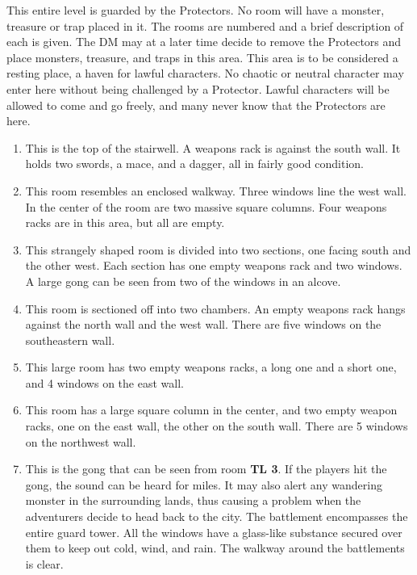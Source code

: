 \documentclass[palace_of_the_silver_princess]{subfiles}
\begin{document}
\selectfont
\clearpage


This entire level is guarded by the Protectors. No room will have a
monster, treasure or trap placed in it. The rooms are numbered and a
brief description of each is given. The DM may at a later time decide to
remove the Protectors and place monsters, treasure, and traps in this
area. This area is to be considered a resting place, a haven for lawful
characters. No chaotic or neutral character may enter here without being
challenged by a Protector. Lawful characters will be allowed to come
and go freely, and many never know that the Protectors are here.

\begin{enumerate}
    \item This is the top of the stairwell. A weapons rack is against the
        south wall. It holds two swords, a mace, and a dagger, all in fairly
        good condition.

    \item This room resembles an enclosed walkway.  Three windows line the
        west wall.  In the center of the room are two massive square columns.
        Four weapons racks are in this area, but all are empty.

    \item This strangely shaped room is divided into two sections, one
        facing south and the other west. Each section has one empty weapons rack
        and two windows. A large gong can be seen from two of the windows in an
        alcove.

    \item This room is sectioned off into two chambers. An empty weapons
        rack hangs against the north wall and the west wall. There are five
        windows on the southeastern wall.

    \item This large room has two empty weapons racks, a long one and a
        short one, and 4 windows on the east wall.

    \item This room has a large square column in the center, and two empty
        weapon racks, one on the east wall, the other on the south wall. There
        are 5 windows on the northwest wall.

    \item This is the gong that can be seen from room \textbf{TL 3}. If the
        players hit the gong, the sound can be heard for miles. It may also
        alert any wandering monster in the surrounding lands, thus causing a
        problem when the adventurers decide to head back to the city. The
        battlement encompasses the entire guard tower. All the windows have a
        glass-like substance secured over them to keep out cold, wind, and rain.
        The walkway around the battlements is clear.
\end{enumerate}
\end{document}
